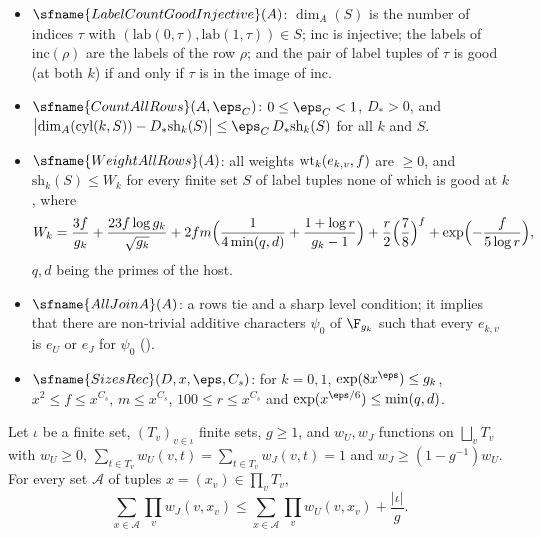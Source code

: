 \begin{definition}\label{pf:top-shape:allrows}
\begin{itemize}
\item $\sfname{LabelCountGoodInjective}(A)$: $\dim_A(S)$ is the number of indices $\tau$ with
$(\mathrm{lab}(0,\tau),\mathrm{lab}(1,\tau))\in S$; $\mathrm{inc}$ is injective; the labels of $\mathrm{inc}(\rho)$ are the
labels of the row $\rho$; and the pair of label tuples of $\tau$ is good (at both $k$) if and only if $\tau$ is in
the image of $\mathrm{inc}$.
\item $\sfname{CountAllRows}(A,\eps_C)$: $0\le\eps_C<1$, $D_*>0$, and
$\bigl|\dim_A(\mathrm{cyl}(k,S))-D_*\mathrm{sh}_k(S)\bigr|\le\eps_C\,D_*\mathrm{sh}_k(S)$ for all $k$ and $S$.
\item $\sfname{WeightAllRows}(A)$: all weights $\mathrm{wt}_k(e_{k,v},f)$ are $\ge0$, and
$\mathrm{sh}_k(S)\le W_k$ for every finite set $S$ of label tuples none of which is good at $k$, where
\begin{multline*}
W_k=\frac{3f}{g_k}+\frac{23f\log g_k}{\sqrt{g_k}}+2fm\Bigl(\frac1{4\min(q,d)}+\frac{1+\log r}{g_k-1}\Bigr)
+\frac r2\Bigl(\frac78\Bigr)^f+\exp\Bigl(-\frac{f}{5\log r}\Bigr),
\end{multline*}
$q,d$ being the primes of the host.
\item $\sfname{AllJoinA}(A)$: a rows tie and a sharp level condition; it implies that there are non-trivial
additive characters $\psi_0$ of $\F_{g_k}$ such that every $e_{k,v}$ is $e_U$ or $e_J$ for $\psi_0$
().
\item $\sfname{SizesRec}(D,x,\eps,C_s)$: for $k=0,1$, $\exp(8x^{\eps})\le g_k$, $x^2\le f\le x^{C_s}$,
$m\le x^{C_s}$, $100\le r\le x^{C_s}$ and $\exp(x^{\eps/6})\le\min(q,d)$.
\end{itemize}
\end{definition}

\begin{lemma}\label{pf:top-shape:transfer}
Let $\iota$ be a finite set, $(T_v)_{v\in\iota}$ finite sets, $g\ge1$, and $w_U,w_J$ functions on $\bigsqcup_vT_v$
with $w_U\ge0$, $\sum_{t\in T_v}w_U(v,t)=\sum_{t\in T_v}w_J(v,t)=1$ and $w_J\ge(1-g^{-1})w_U$. For every set
$\mathcal A$ of tuples $x=(x_v)\in\prod_vT_v$,
\[
\sum_{x\in\mathcal A}\prod_vw_J(v,x_v)\le\sum_{x\in\mathcal A}\prod_vw_U(v,x_v)+\frac{|\iota|}{g}.
\]
\end{lemma}

